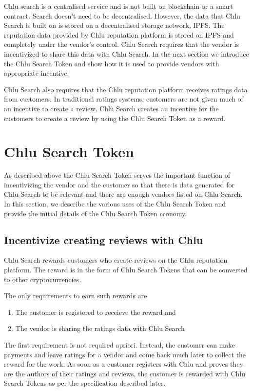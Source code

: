 \documentclass[a4paper]{article}
\begin{document}
Chlu search is a centralised service and is not built on blockchain or
a smart contract. Search doesn't need to be decentralised. However,
the data that Chlu Search is built on is stored on a decentralised
storage network, IPFS. The reputation data provided by Chlu reputation
platform is stored on IPFS and completely under the vendor's
control. Chlu Search requires that the vendor is incentivized to share
this data with Chlu Search. In the next section we introduce the Chlu
Search Token and show how it is used to provide vendors with
appropriate incentive.

Chlu Search also requires that the Chlu reputation platform receives
ratings data from customers. In traditional ratings systems, customers
are not given much of an incentive to create a review. Chlu Search
creates an incentive for the customers to create a review by using the
Chlu Search Token as a reward.

\section{Chlu Search Token}

As described above the Chlu Search Token serves the important function
of incentivizing the vendor and the customer so that there is data
generated for Chlu Search to be relevant and there are enough vendors
listed on Chlu Search. In this section, we describe the various uses
of the Chlu Search Token and provide the initial details of the Chlu
Search Token economy.

\subsection{Incentivize creating reviews with Chlu}

Chlu Search rewards customers who create reviews on the Chlu
reputation platform. The reward is in the form of Chlu Search Tokens
that can be converted to other cryptocurrencies.

The only requirements to earn such rewards are

\begin{enumerate}
\item The customer is registered to receieve the reward and
\item The vendor is sharing the ratings data with Chlu Search
\end{enumerate}

The first requirement is not required apriori. Instead, the customer
can make payments and leave ratings for a vendor and come back much
later to collect the reward for the work. As soon as a customer
registers with Chlu and proves they are the authors of their ratings
and reviews, the customer is rewarded with Chlu Search Tokens as per
the specification described later.
\end{document}
